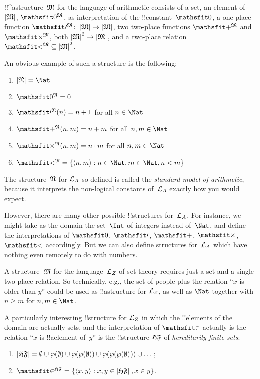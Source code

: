 \documentclass[../../include/open-logic-section]{subfiles}
\begin{document}
\begin{ex}
!!^a{structure}~$\mathfrak M$ for the language of arithmetic consists of a
  set, an element of $\left| \mathfrak M \right|$, $\Assign{\Obj 0}{M}$, as
  interpretation of the !!{constant}~$\Obj 0$, a one-place function
  $\Assign{\Obj \prime}{M} \colon \Domain{M} \to \Domain M$, two
  two-place functions $\Assign{\Obj +}{M}$ and $\Assign{\Obj
    \times}{M}$, both $\left| \mathfrak M \right|^2 \to \left| \mathfrak M \right|$, and a two-place
  relation $\Assign{\Obj <}{M} \subseteq \Domain{M}^2$.

An obvious example of such a structure is the following:
\begin{enumerate}
\item $\Domain N = \Nat$
\item $\Assign{\Obj 0}{N} = 0$
\item $\Assign{\Obj \prime}{N}(n) = n + 1$ for all $n \in \Nat$
\item $\Assign{\Obj +}{N}(n, m) = n + m$ for all $n, m \in \Nat$
\item $\Assign{\Obj \times}{N}(n, m) = n\cdot m$ for all $n, m \in \Nat$
\item $\Assign{\Obj <}{N} = \Setabs{\tuple{n, m}}{n \in \Nat, m \in
  \Nat, n < m}$
\end{enumerate}
The structure~$\mathfrak N$ for $\mathcal L_A$ so defined is called the
\emph{standard model of arithmetic}, because it interprets the
non-logical constants of~$\mathcal L_A$ exactly how you would expect.

However, there are many other possible !!{structure}s for~$\mathcal L_A$. For instance, we might take as the domain the set~$\Int$ of
integers instead of~$\Nat$, and define the interpretations of $\Obj
0$, $\Obj \prime$, $\Obj +$, $\Obj \times$, $\Obj <$ accordingly.  But
we can also define structures for~$\mathcal L_A$ which have nothing even
remotely to do with numbers.
\end{ex}

\begin{ex}
A structure~$\mathfrak M$ for the language~$\mathcal L_Z$ of set theory requires
just a set and a single-two place relation. So technically, e.g., the
set of people plus the relation ``$x$ is older than $y$'' could be
used as !!a{structure} for $\mathcal L_Z$, as well as $\Nat$ together
with $n \ge m$ for $n, m \in \Nat$.

A particularly interesting !!{structure} for $\mathcal L_Z$ in which the
!!{element}s of the domain are actually sets, and the interpretation
of $\Obj \in$ actually is the relation ``$x$ is !!a{element} of~$y$''
is the !!{structure} $\mathfrak {HF}$ of \emph{hereditarily finite sets}:
\begin{enumerate}
\item $\left| \mathfrak {HF} \right| = \emptyset \cup \wp(\emptyset) \cup
  \wp(\wp(\emptyset)) \cup \wp(\wp(\wp(\emptyset))) \cup \dots$;
\item $\Assign{\Obj \in}{{{HF}}} = \Setabs{\tuple{x, y}}{x, y \in
  \Domain{{{HF}}}, x \in y}$.
\end{enumerate}
\end{ex}
\end{document}
